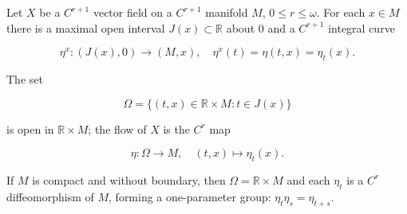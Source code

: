 Let $X$ be a $C^{r+1}$ vector field on a $C^{r+1}$ manifold $M$, $0 \leqslant r \leqslant \omega$. For each $x \in M$ there is a maximal open interval $J(x) \subset \mathbb{R}$ about $0$ and a $C^{r+1}$ integral curve

$$\eta^x: (J(x), 0) \to (M, x), \quad \eta^x(t) = \eta(t, x) = \eta_t(x).$$

The set

$$\Omega = \{(t, x) \in \mathbb{R} \times M : t \in J(x)\}$$

is open in $\mathbb{R} \times M$; the flow of $X$ is the $C^r$ map

$$\eta: \Omega \to M, \quad (t, x) \mapsto \eta_t(x).$$

If $M$ is compact and without boundary, then $\Omega = \mathbb{R} \times M$ and each $\eta_t$ is a $C^r$ diffeomorphism of $M$, forming a one-parameter group: $\eta_t \eta_s = \eta_{t+s}$.
